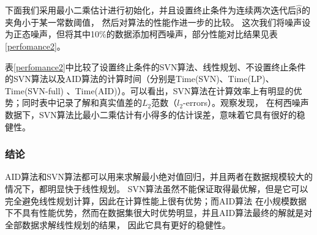 下面我们采用最小二乘估计进行初始化，并且设置终止条件为连续两次迭代后$\hat{\bm{\beta}}$的夹角小于某一常数阈值，
然后对算法的性能作进一步的比较。
这次我们将噪声设为正态噪声，但将其中10\%的数据添加柯西噪声，部分性能对比结果见表\ref{perfomance2}。

\begin{table}[H]
    \small
    \caption{部分性能结果对比}\label{perfomance2}
\end{table}

表\ref{perfomance2}中比较了设置终止条件的SVN算法、线性规划、不设置终止条件的SVN算法以及AID算法的计算时间（分别是Time(SVN)、Time(LP)、Time(SVN-full)
、Time(AID)）。可以看出，SVN算法在计算效率上有明显的优势；同时表中记录了解和真实值差的$L_2$范数（$l_2$-errors）。观察发现，
在柯西噪声数据下，SVN算法比最小二乘估计有小得多的估计误差，意味着它具有很好的稳健性。


\subsubsection{结论}
AID算法和SVN算法都可以用来求解最小绝对值回归，并且两者在数据规模较大的情况下，都明显快于线性规划。
SVN算法虽然不能保证取得最优解，但是它可以完全避免线性规划计算，因此在计算性能上很有优势；而AID算法
在小规模数据下不具有性能优势，然而在数据集很大时优势明显，并且AID算法最终的解就是对全部数据求解线性规划的结果，
因此它具有更好的稳健性。

